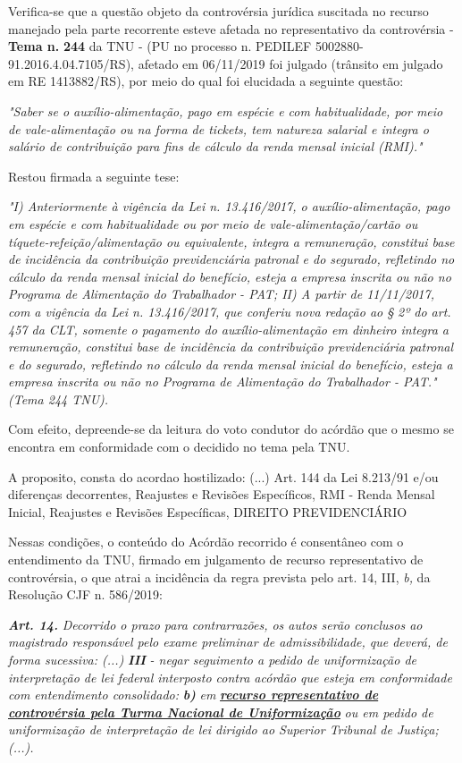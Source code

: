 \documentclass[12pt]{article}
\begin{document}
\justifying
\noindent Verifica-se que a questão objeto da controvérsia jurídica suscitada no recurso manejado pela parte recorrente esteve afetada no representativo da controvérsia - \textbf{Tema n. }\textbf{244} da TNU - (PU no processo n. PEDILEF 5002880-91.2016.4.04.7105/RS),  afetado em 06/11/2019 foi julgado (trânsito em julgado em RE 1413882/RS), por meio do qual foi elucidada a seguinte questão:

\noindent \textit{"Saber se o auxílio-alimentação, pago em espécie e com habitualidade, por meio de vale-alimentação ou na forma de tickets, tem natureza salarial e integra o salário de contribuição para fins de cálculo da renda mensal inicial (RMI)."}

\noindent Restou firmada a seguinte tese:

\noindent \textit{"I) Anteriormente à vigência da Lei n. 13.416/2017, o auxílio-alimentação, pago em espécie e com habitualidade ou por meio de vale-alimentação/cartão ou tíquete-refeição/alimentação ou equivalente, integra a remuneração, constitui base de incidência da contribuição previdenciária patronal e do segurado, refletindo no cálculo da renda mensal inicial do benefício, esteja a empresa inscrita ou não no Programa de Alimentação do Trabalhador - PAT; II) A partir de 11/11/2017, com a vigência da Lei n. 13.416/2017, que conferiu nova redação ao § 2º do art. 457 da CLT, somente o pagamento do auxílio-alimentação em dinheiro integra a remuneração, constitui base de incidência da contribuição previdenciária patronal e do segurado, refletindo no cálculo da renda mensal inicial do benefício, esteja a empresa inscrita ou não no Programa de Alimentação do Trabalhador - PAT." (Tema 244 TNU).}

\noindent Com efeito, depreende-se da leitura do voto condutor do acórdão que o mesmo se encontra em conformidade com o decidido no  tema pela TNU.

\noindent A proposito, consta do acordao hostilizado: (...) Art. 144 da Lei 8.213/91 e/ou diferenças decorrentes, Reajustes e Revisões Específicos, RMI - Renda Mensal Inicial, Reajustes e Revisões Específicas, DIREITO PREVIDENCIÁRIO

\noindent Nessas condições, o conteúdo do Acórdão recorrido é consentâneo com o entendimento da TNU, firmado em julgamento de recurso representativo de controvérsia, o que atrai a incidência da regra prevista pelo art. 14, III, \textit{b,} da Resolução CJF n. 586/2019:

\noindent \textit{\textbf{Art. 14.}}\textit{ Decorrido o prazo para contrarrazões, os autos serão conclusos ao magistrado responsável pelo exame preliminar de admissibilidade, que deverá, de forma sucessiva: (...) }\textit{\textbf{III }}\textit{- negar seguimento a pedido de uniformização de interpretação de lei federal interposto contra acórdão que esteja em conformidade com entendimento consolidado: }\textit{\textbf{b)}}\textit{ em }\uline{\textit{\textbf{recurso representativo de controvérsia pela Turma Nacional de Uniformização}}}\textit{ ou em pedido de uniformização de interpretação de lei dirigido ao Superior Tribunal de Justiça;(...).}
\end{document}

